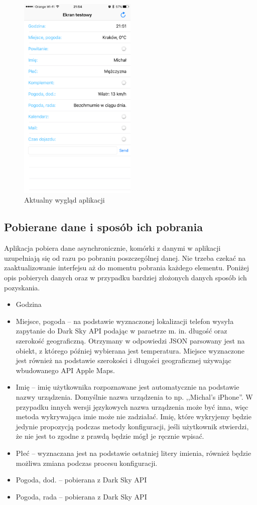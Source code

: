 \documentclass[a4paper,11pt]{article}
\begin{document}
\begin{figure}[H]
	\includegraphics[width=0.5\textwidth,center]{ios_main_scrren.png}
	\caption {Aktualny wygląd aplikacji}
	\label{ios_main_screen}
\end{figure}

\subsection{Pobierane dane i sposób ich pobrania}
Aplikacja pobiera dane asynchronicznie, komórki z danymi w aplikacji uzupełniają się od razu po pobraniu poszczególnej danej. Nie trzeba czekać na zaaktualizowanie interfejsu aż do momentu pobrania każdego elementu. Poniżej opis pobierych danych oraz w przypadku bardziej złożonych danych sposób ich pozyskania.

\begin{itemize}
\item Godzina
\item Miejsce, pogoda -- na podstawie wyznaczonej lokalizacji telefon wysyła zapytanie do Dark Sky API podając w paraetrze m. in. długość oraz szerokość geograficzną. Otrzymany w odpowiedzi JSON parsowany jest na obiekt, z którego później wybierana jest temperatura. Miejsce wyznaczone jest również na podstawie szerokości i długości geograficznej używając wbudowanego  API Apple Maps.
\item Imię -- imię użytkownika rozpoznawane jest automatycznie na podstawie nazwy urządzenia. Domyślnie nazwa urządzenia to np. ,,Michal's iPhone''. W przypadku innych wersji językowych nazwa urządzenia może być inna, więc metoda wykrywająca imie może nie zadziałać. Imię, które wykryjemy będzie jedynie propozycją podczas metody konfiguracji, jeśli użytkownik stwierdzi, że nie jest to zgodne z prawdą będzie mógł je ręcznie wpisać.
\item Płeć -- wyznaczana jest na podstawie ostatniej litery imienia, również będzie możliwa zmiana podczas procesu konfiguracji.
\item Pogoda, dod. -- pobierana z Dark Sky API
\item Pogoda, rada -- pobierana z Dark Sky API
\end{itemize}
\end{document}
